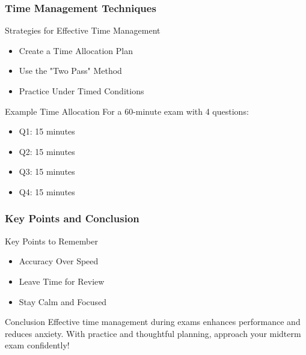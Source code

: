 \documentclass{beamer}
\begin{document}
\begin{frame}[fragile]
    \frametitle{Time Management Techniques}

    \begin{block}{Strategies for Effective Time Management}
        \begin{itemize}
            \item Create a Time Allocation Plan
            \item Use the "Two Pass" Method
            \item Practice Under Timed Conditions
        \end{itemize}
    \end{block}
    
    \begin{block}{Example Time Allocation}
        For a 60-minute exam with 4 questions:
        \begin{itemize}
            \item Q1: 15 minutes
            \item Q2: 15 minutes
            \item Q3: 15 minutes
            \item Q4: 15 minutes
        \end{itemize}
    \end{block}
    
\end{frame}

\begin{frame}[fragile]
    \frametitle{Key Points and Conclusion}

    \begin{block}{Key Points to Remember}
        \begin{itemize}
            \item Accuracy Over Speed
            \item Leave Time for Review
            \item Stay Calm and Focused
        \end{itemize}
    \end{block}
    
    \begin{block}{Conclusion}
        Effective time management during exams enhances performance and reduces anxiety. 
        With practice and thoughtful planning, approach your midterm exam confidently!
    \end{block}
    
\end{frame}
\end{document}
